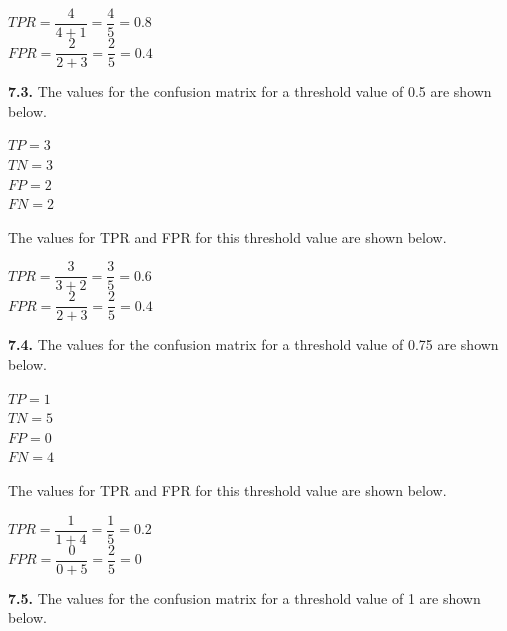 \documentclass[12pt]{article}
\begin{document}
\begin{center}

$TPR=\dfrac{4}{4+1}=\dfrac{4}{5}=0.8$\\
\bigskip
$FPR=\dfrac{2}{2+3}=\dfrac{2}{5}=0.4$\\

\end{center}

{\bf 7.3.} The values for the confusion matrix for a threshold value of 0.5 are shown below.

\begin{center}

$TP=3$\\
$TN=3$\\
$FP=2$\\
$FN=2$\\

\end{center}

The values for TPR and FPR for this threshold value are shown below.

\begin{center}

$TPR=\dfrac{3}{3+2}=\dfrac{3}{5}=0.6$\\
\bigskip
$FPR=\dfrac{2}{2+3}=\dfrac{2}{5}=0.4$\\

\end{center}

{\bf 7.4.} The values for the confusion matrix for a threshold value of 0.75 are shown below.

\begin{center}

$TP=1$\\
$TN=5$\\
$FP=0$\\
$FN=4$\\

\end{center}

The values for TPR and FPR for this threshold value are shown below.

\begin{center}

$TPR=\dfrac{1}{1+4}=\dfrac{1}{5}=0.2$\\
\bigskip
$FPR=\dfrac{0}{0+5}=\dfrac{2}{5}=0$\\

\end{center}

{\bf 7.5.} The values for the confusion matrix for a threshold value of 1 are shown below.
\end{document}
